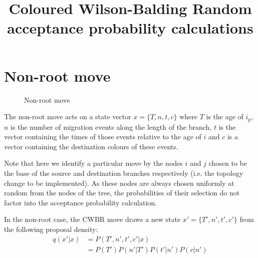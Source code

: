 \documentclass[a4paper,11pt]{article}
\title{Coloured Wilson-Balding Random\\%
acceptance probability calculations}
\begin{document}
\maketitle

\section{Non-root move}

\begin{figure}
\begin{center}
\end{center}
\caption{Non-root move}
\end{figure}

The non-root move acts on a state vector $x=\{T,n,t,c\}$ where $T$ is
the age of $i_p$, $n$ is the number of migration events along the
length of the branch, $t$ is the vector containing the times of those
events relative to the age of $i$ and $c$ is a vector containing the
destination colours of these events.

Note that here we identify a particular move by the nodes $i$ and $j$
chosen to be the base of the source and destination branches
respectively (i.e. the topology change to be implemented). As these
nodes are always chosen uniformly at random from the nodes of the
tree, the probabilities of their selection do not factor into the
acceptance probability calculation.

In the non-root case, the CWBR move draws a new state
$x'=\{T',n',t',c'\}$ from the following proposal density:
\begin{align}
  q(x'|x) &= P(T',n',t',c'|x)\nonumber\\
&= P(T')P(n'|T')P(t'|n')P(c|n')
\end{align}
\end{document}
